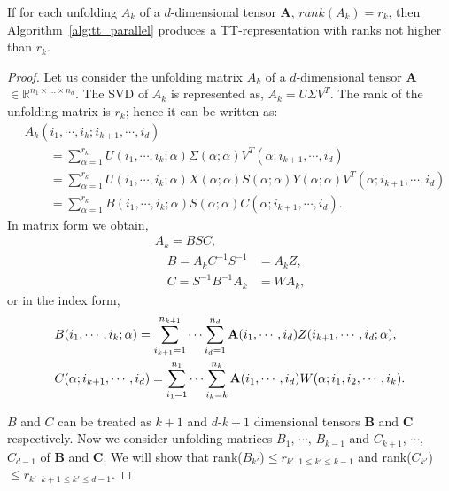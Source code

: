 \documentclass[runningheads]{llncs}
\newcommand{\tensor}[1]{{\cal\textbf{#1}\xspace}}
\begin{document}
\begin{theorem}
	If for each unfolding $A_k$ of a $d$-dimensional tensor \tensor{A}, $rank(A_k)=r_k$, then Algorithm~\ref{alg:tt_parallel} produces a TT-representation with ranks not higher than $r_k$.
\end{theorem}
\begin{proof}
	Let us consider the unfolding matrix $A_k$ of a $d$-dimensional tensor \tensor{A}$\in \mathbb{R}^{n_1 \times \ldots \times n_d}$. The SVD of $A_k$ is represented as, $A_k = U \Sigma V^T$. The rank of the unfolding matrix is $r_k$; hence it can be written as:
	\begin{align*}
	&A_k(i_1,\cdots,i_k;i_{k+1},\cdots, i_d)\\
	&\qquad= \sum_{\alpha=1}^{r_k} U(i_1,\cdots,i_k; \alpha)\Sigma(\alpha; \alpha)V^T(\alpha;i_{k+1},\cdots, i_d)\\
	&\qquad= \sum_{\alpha=1}^{r_k} U(i_1,\cdots,i_k; \alpha)X(\alpha; \alpha)S(\alpha; \alpha)Y(\alpha; \alpha) V^T(\alpha;i_{k+1},\cdots, i_d)\\
	&\qquad= \sum_{\alpha=1}^{r_k} B(i_1,\cdots,i_k; \alpha)S(\alpha; \alpha)C(\alpha;i_{k+1},\cdots, i_d).
	\end{align*}
	In matrix form we obtain,
	\begin{align*}
	A_k = BSC,\quad\ \ &\\
	\quad B = A_k C^{-1}S^{-1} &= A_kZ, \\
	\quad C = S^{-1}B^{-1}A_k &= WA_k,
	\end{align*}
	\noindent or in the index form,
	{\small\begin{align*}
		&B(i_1,\cdots, i_k; \alpha) = \sum_{i_{k+1}=1}^{n_{k+1}}\cdots\sum_{i_d=1}^{n_d} \tensor{A}(i_1, \cdots, i_d) Z(i_{k+1},\cdots, i_d;\alpha), \\
		&C(\alpha; i_{k+1},\cdots, i_d) = \sum_{i_1=1}^{n_1} \cdots \sum_{i_k=k}^{n_k} \tensor{A}(i_1, \cdots, i_d) W(\alpha;i_1,i_2,\cdots, i_k).
		\end{align*}}
	
	\noindent $B$ and $C$ can be treated as $k+1$ and $d$-$k+1$ dimensional tensors \tensor{B} and \tensor{C} respectively. Now we consider unfolding matrices $B_1$, $\cdots$, $B_{k-1}$ and $C_{k+1}$, $\cdots$, $C_{d-1}$ of \tensor{B} and \tensor{C}. We will show that rank($B_{k'}$)$ \le r_{k'}$ $_{1\le k' \le k-1}$ and rank($C_{k'}$)$\le r_{k'}$ $_{k+1\le k' \le d-1}$.
	

\end{proof}
\end{document}
